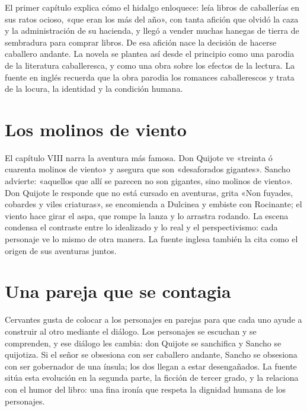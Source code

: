\documentclass{book}
\begin{document}
El primer capítulo explica cómo el hidalgo enloquece: leía libros de caballerías en sus ratos ocioso, «que eran los más del año», con tanta afición que olvidó la caza y la administración de su hacienda, y llegó a vender muchas hanegas de tierra de sembradura para comprar libros. De esa afición nace la decisión de hacerse caballero andante. La novela se plantea así desde el principio como una parodia de la literatura caballeresca, y como una obra sobre los efectos de la lectura. La fuente en inglés recuerda que la obra parodia los romances caballerescos y trata de la locura, la identidad y la condición humana.


\section{Los molinos de viento}

El capítulo VIII narra la aventura más famosa. Don Quijote ve «treinta ó cuarenta molinos de viento» y asegura que son «desaforados gigantes». Sancho advierte: «aquellos que allí se parecen no son gigantes, sino molinos de viento». Don Quijote le responde que no está cursado en aventuras, grita «Non fuyades, cobardes y viles criaturas», se encomienda a Dulcinea y embiste con Rocinante; el viento hace girar el aspa, que rompe la lanza y lo arrastra rodando. La escena condensa el contraste entre lo idealizado y lo real y el perspectivismo: cada personaje ve lo mismo de otra manera. La fuente inglesa también la cita como el origen de sus aventuras juntos.


\section{Una pareja que se contagia}

Cervantes gusta de colocar a los personajes en parejas para que cada uno ayude a construir al otro mediante el diálogo. Los personajes se escuchan y se comprenden, y ese diálogo les cambia: don Quijote se sanchifica y Sancho se quijotiza. Si el señor se obsesiona con ser caballero andante, Sancho se obsesiona con ser gobernador de una ínsula; los dos llegan a estar desengañados. La fuente sitúa esta evolución en la segunda parte, la ficción de tercer grado, y la relaciona con el humor del libro: una fina ironía que respeta la dignidad humana de los personajes.
\end{document}
